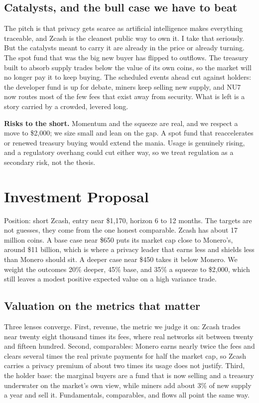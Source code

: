 \documentclass[11pt]{article}
\begin{document}
\subsection{Catalysts, and the bull case we have to beat}
The pitch is that privacy gets scarce as artificial intelligence makes everything traceable, and Zcash is the cleanest public way to own it. I take that seriously. But the catalysts meant to carry it are already in the price or already turning. The spot fund that was the big new buyer has flipped to outflows. The treasury built to absorb supply trades below the value of its own coins, so the market will no longer pay it to keep buying. The scheduled events ahead cut against holders: the developer fund is up for debate, miners keep selling new supply, and NU7 now routes most of the few fees that exist away from security. What is left is a story carried by a crowded, levered long.

\textbf{Risks to the short.} Momentum and the squeeze are real, and we respect a move to \$2,000; we size small and lean on the gap. A spot fund that reaccelerates or renewed treasury buying would extend the mania. Usage is genuinely rising, and a regulatory overhang could cut either way, so we treat regulation as a secondary risk, not the thesis.

\section{Investment Proposal}

Position: short Zcash, entry near \$1,170, horizon 6 to 12 months. The targets are not guesses, they come from the one honest comparable. Zcash has about 17 million coins. A base case near \$650 puts its market cap close to Monero's, around \$11 billion, which is where a privacy leader that earns less and shields less than Monero should sit. A deeper case near \$450 takes it below Monero. We weight the outcomes 20\% deeper, 45\% base, and 35\% a squeeze to \$2,000, which still leaves a modest positive expected value on a high variance trade.

\subsection{Valuation on the metrics that matter}
Three lenses converge. First, revenue, the metric we judge it on: Zcash trades near twenty eight thousand times its fees, where real networks sit between twenty and fifteen hundred. Second, comparables: Monero earns nearly twice the fees and clears several times the real private payments for half the market cap, so Zcash carries a privacy premium of about two times its usage does not justify. Third, the holder base: the marginal buyers are a fund that is now selling and a treasury underwater on the market's own view, while miners add about 3\% of new supply a year and sell it. Fundamentals, comparables, and flows all point the same way.
\end{document}
